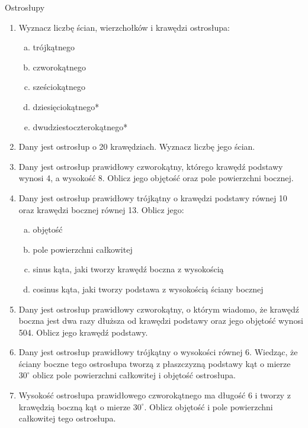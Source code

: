 \documentclass[12pt,a4paper]{article}
\begin{document}
	\newpage
	\begin{center}
		\large Ostrosłupy
	\end{center}
	\begin{enumerate}[1.]
	\item Wyznacz liczbę ścian, wierzchołków i krawędzi ostrosłupa:
	\begin{enumerate}[a)]
		\item trójkątnego
		\item czworokątnego
		\item sześciokątnego
		\item dziesięciokątnego*
		\item dwudziestoczterokątnego*
	\end{enumerate}
	
	\item Dany jest ostrosłup o 20 krawędziach. Wyznacz liczbę jego ścian.

	\item Dany jest ostrosłup prawidłowy czworokątny, którego krawędź podstawy wynosi 4, a wysokość 8. Oblicz jego objętość oraz pole powierzchni bocznej.
	
	\item Dany jest ostrosłup prawidłowy trójkątny o krawędzi podstawy równej 10 oraz krawędzi bocznej równej 13. Oblicz jego:
	\begin{enumerate}[a)]
		\item objętość
		\item pole powierzchni całkowitej
		\item sinus kąta, jaki tworzy krawędź boczna z wysokością
		\item cosinus kąta, jaki tworzy podstawa z wysokością ściany bocznej
	\end{enumerate}

	\item Dany jest ostrosłup prawidłowy czworokątny, o którym wiadomo, że krawędź boczna jest dwa razy dłuższa od krawędzi podstawy oraz jego objętość wynosi 504. Oblicz jego krawędź podstawy.

	\item Dany jest ostrosłup prawidłowy trójkątny o wysokości równej 6. Wiedząc, że ściany boczne tego ostrosłupa tworzą z płaszczyzną podstawy kąt o mierze $30^\circ$ oblicz pole powierzchni całkowitej i objętość ostrosłupa.

	\item Wysokość ostrosłupa prawidłowego czworokątnego ma długość 6 i tworzy z krawędzią boczną kąt o mierze $30^\circ$. Oblicz objętość i pole powierzchni całkowitej tego ostrosłupa.


\end{enumerate}
\end{document}
